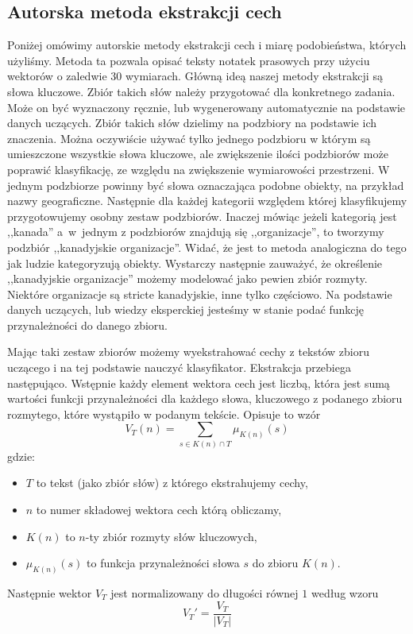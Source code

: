 \documentclass[a4paper]{classrep}
\begin{document}
\subsection{Autorska metoda ekstrakcji cech}
\label{sec:autorska}
Poniżej omówimy autorskie metody ekstrakcji cech i miarę podobieństwa, których użyliśmy. Metoda ta pozwala opisać teksty notatek prasowych przy użyciu wektorów o zaledwie \(30\) wymiarach.
Główną ideą naszej metody ekstrakcji są słowa kluczowe. Zbiór takich słów należy przygotować dla konkretnego zadania. Może on być wyznaczony ręcznie,
lub wygenerowany automatycznie na podstawie danych uczących. Zbiór takich słów dzielimy na podzbiory na podstawie ich znaczenia. Można oczywiście używać tylko jednego podzbioru
w którym są umieszczone wszystkie słowa kluczowe, ale zwiększenie ilości podzbiorów może poprawić klasyfikację, ze względu na zwiększenie wymiarowości przestrzeni. 
W jednym podzbiorze powinny być słowa oznaczająca podobne obiekty, na przykład nazwy geograficzne. Następnie dla każdej kategorii względem której klasyfikujemy przygotowujemy
osobny zestaw podzbiorów. Inaczej mówiąc jeżeli kategorią jest ,,kanada'' a~w~jednym z podzbiorów znajdują się ,,organizacje'', to tworzymy podzbiór ,,kanadyjskie organizacje''.
Widać, że jest to metoda analogiczna do tego jak ludzie kategoryzują obiekty. Wystarczy następnie zauważyć, że określenie ,,kanadyjskie organizacje'' możemy modelować
jako pewien zbiór rozmyty. Niektóre organizacje są stricte kanadyjskie, inne tylko częściowo. Na podstawie danych uczących, lub wiedzy eksperckiej jesteśmy w stanie podać
funkcję przynależności do danego zbioru.

Mając taki zestaw zbiorów możemy wyekstrahować cechy z tekstów zbioru uczącego i na tej podstawie nauczyć klasyfikator. Ekstrakcja przebiega następująco. Wstępnie każdy element wektora
cech jest liczbą, która jest sumą wartości funkcji przynależności dla każdego słowa, kluczowego z podanego zbioru rozmytego, które wystąpiło w podanym tekście.
Opisuje to wzór
\begin{equation}
V_T(n)=\sum_{s\in K(n) \cap T} \mu_{K(n)}(s)
\end{equation}
gdzie:
\begin{itemize}
\item \(T\) to tekst (jako zbiór słów) z którego ekstrahujemy cechy,
\item \(n\) to numer składowej wektora cech którą obliczamy,
\item \(K(n)\) to \(n\)-ty zbiór rozmyty słów kluczowych,
\item \(\mu_{K(n)}(s)\) to funkcja przynależności słowa \(s\) do zbioru \(K(n)\).
\end{itemize}
\noindent Następnie wektor \(V_T\) jest normalizowany do długości równej \(1\) według wzoru
\begin{equation}
V_T' = \frac{V_T}{|V_T|}
\end{equation}
\end{document}
